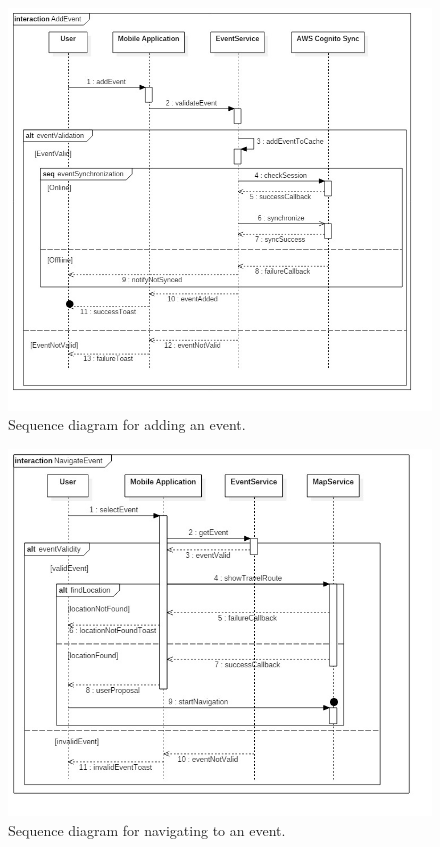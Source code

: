 \begin{figure}[H]
	\centering
	\includegraphics[width=6in]{./diagrams/AddEvent.jpg}
	\caption{Sequence diagram for adding an event.}
	\label{fig:seqAddEvent}
\end{figure}

\begin{figure}[H]
	\centering
	\includegraphics[width=6in]{./diagrams/NavigateEvent.jpg}
	\caption{Sequence diagram for navigating to an event.}
	\label{fig:seqNavigateEvent}
\end{figure}



